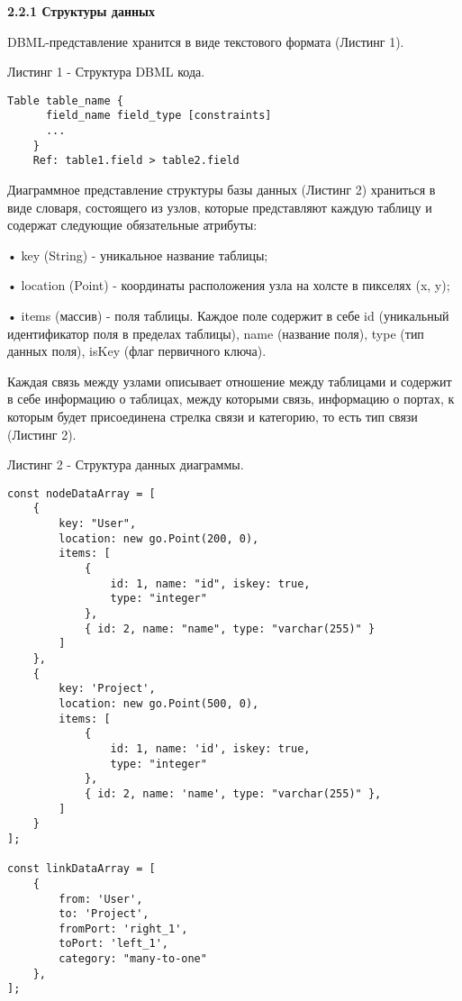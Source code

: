 \textbf{2.2.1 Структуры данных}

DBML-представление хранится в виде текстового формата (Листинг 1).

Листинг 1 - Структура DBML кода.
\begin{lstlisting}[frame=single]
    Table table_name {
      field_name field_type [constraints]
      ...
    }
    Ref: table1.field > table2.field
\end{lstlisting}

Диаграммное представление структуры базы данных (Листинг 2) храниться в виде словаря, состоящего из узлов, которые представляют каждую таблицу  и содержат следующие обязательные атрибуты:

• key (String) - уникальное название таблицы;

• location (Point) - координаты расположения узла на холсте в пикселях (x, y);

• items (массив) - поля таблицы. Каждое поле содержит в себе id (уникальный идентификатор поля в пределах таблицы), name (название поля), type (тип данных поля), isKey (флаг первичного ключа). 

Каждая связь между узлами описывает отношение между таблицами и содержит в себе информацию о таблицах, между которыми связь, информацию о портах, к которым будет присоединена стрелка связи и категорию, то есть тип связи (Листинг 2). 

Листинг 2 - Структура данных диаграммы.
\begin{lstlisting}[label=some-code,frame=single]
const nodeDataArray = [
    {
        key: "User",
        location: new go.Point(200, 0),
        items: [
            {
                id: 1, name: "id", iskey: true,
                type: "integer"
            },
            { id: 2, name: "name", type: "varchar(255)" }
        ]
    },
    {
        key: 'Project',
        location: new go.Point(500, 0),
        items: [
            {
                id: 1, name: 'id', iskey: true,
                type: "integer"
            },
            { id: 2, name: 'name', type: "varchar(255)" },
        ]
    }
];

const linkDataArray = [
    {
        from: 'User',
        to: 'Project',
        fromPort: 'right_1',
        toPort: 'left_1',
        category: "many-to-one"
    },
];
\end{lstlisting}
